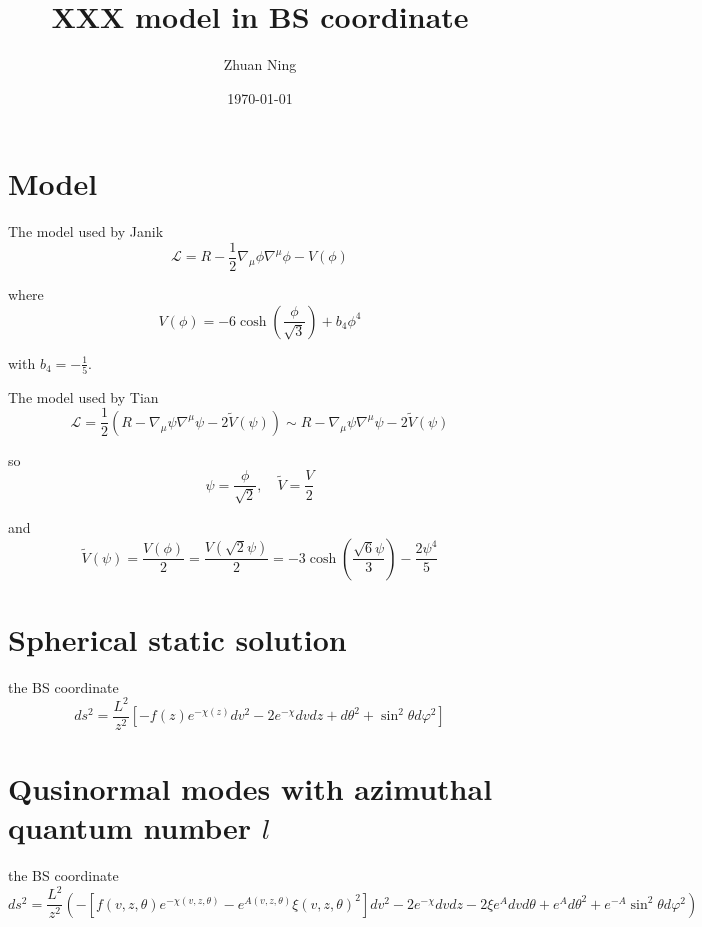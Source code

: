 \documentclass[12pt,a4paper]{ctexart}
\title{XXX model in BS coordinate}
\author{Zhuan Ning}
\date{\today}
\numberwithin{equation}{section}
\begin{document}
\maketitle

\section{Model}

The model used by Janik
\begin{equation}
    \mathcal{L}=R-\frac{1}{2}\nabla_\mu\phi\nabla^\mu\phi-V(\phi)
\end{equation}

where
\begin{equation}
    V(\phi)=-6\cosh(\frac{\phi}{\sqrt{3}})+b_4\phi^4
\end{equation}

with $b_4=-\frac{1}{5}$.

The model used by Tian
\begin{equation}
    \mathcal{L}=\frac{1}{2}(R-\nabla_\mu\psi\nabla^\mu\psi-2\tilde{V}(\psi))\sim R-\nabla_\mu\psi\nabla^\mu\psi-2\tilde{V}(\psi)
\end{equation}

so
\begin{equation}
    \psi=\frac{\phi}{\sqrt{2}},\quad\tilde{V}=\frac{V}{2}
\end{equation}

and
\begin{equation}
    \tilde{V}(\psi)=\frac{V(\phi)}{2}=\frac{V(\sqrt{2}\psi)}{2}=-3\cosh(\frac{\sqrt{6}\psi}{3})-\frac{2\psi^4}{5}
\end{equation}

\section{Spherical static solution}

the BS coordinate
\begin{equation}
    ds^2=\frac{L^2}{z^2}[-f(z)e^{-\chi(z)}dv^2-2e^{-\chi}dvdz+d\theta^2+\sin^2\theta d\varphi^2]
\end{equation}

\section{Qusinormal modes with azimuthal quantum number $l$}

the BS coordinate
\begin{equation}
    ds^2=\frac{L^2}{z^2}(-[f(v,z,\theta)e^{-\chi(v,z,\theta)}-e^{A(v,z,\theta)}\xi(v,z,\theta)^2]dv^2-2e^{-\chi}dvdz-2\xi e^Advd\theta+e^Ad\theta^2+e^{-A}\sin^2\theta d\varphi^2)
\end{equation}
\end{document}
